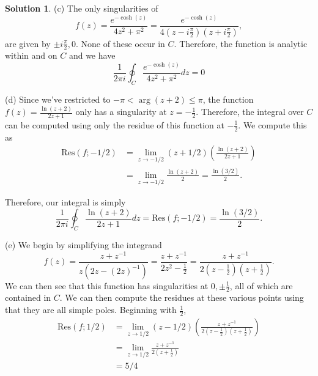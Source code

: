 \documentclass[12pt]{article}
\newcommand{\Res}{\text{Res}}
\theoremstyle{definition}
\newtheorem{sol}{Solution}
\theoremstyle{remark}
\begin{document}
\begin{sol}
    \newpage

    (c) The only singularities of  
\begin{equation*}
    f(z) = \frac{e^{-\cosh(z)}}{4z^2 + \pi^2} = \frac{e^{-\cosh(z)}}{4(z-i\frac{\pi}{2})(z + i \frac{\pi}{2})},
\end{equation*}
are given by $\pm i \frac{\pi}{2}, 0$. None of these occur in $C$. Therefore, the function is analytic within and on $C$ and we have
\begin{equation*}
        \frac{1}{2\pi i} \oint_C \frac{e^{-\cosh(z)}}{4z^2 + \pi^2} dz = 0
    \end{equation*}

    \newpage

    (d) Since we've restricted to $-\pi < \arg(z+2) \leq \pi$, the function $f(z) = \frac{\ln(z+2)}{2z+1}$ only has a singularity at $z = -\frac{1}{2}$.  Therefore, the integral over $C$ can be computed using only the residue of this function at $-\frac{1}{2}$. We compute this as 
    \begin{align*}
        \Res(f; -1/2) &= \lim_{z\to -1/2} (z +1/2) \left(\frac{\ln(z+2)}{2z+1} \right)\\
                      &= \lim_{z\to -1/2} \frac{\ln(z+2)}{2} = \frac{\ln(3/2)}{2}. 
    \end{align*}

    Therefore, our integral is simply
    \begin{equation*}
            \frac{1}{2\pi i} \oint_C \frac{\ln(z+2)}{2z+1} dz = \Res(f; -1/2) = \frac{\ln(3/2)}{2}. 
    \end{equation*}

    \newpage

    (e) We begin by simplifying the integrand
    \begin{equation*}
        f(z)= \frac{z + z^{-1}}{z (2z - (2z)^{-1})} = \frac{z+z^{-1}}{2z^2 - \frac{1}{2}} = \frac{z + z^{-1}}{2 (z- \frac{1}{2})(z+\frac{1}{2})}.
    \end{equation*}
    We can then see that this function has singularities at $0, \pm\frac{1}{2}$, all of which are contained in $C$. We can then compute the residues at these various points using that they are all simple poles. Beginning with $\frac{1}{2}$, 
\begin{align*}
    \Res(f; 1/2) &= \lim_{z\to 1/2} (z-1/2) \left(\frac{z + z^{-1}}{2 (z- \frac{1}{2})(z+\frac{1}{2})}\right)\\
                 &= \lim_{z\to 1/2} \frac{z + z^{-1}}{2 (z+\frac{1}{2})}\\
                 &= 5 / 4
\end{align*}


\end{sol}
\end{document}
